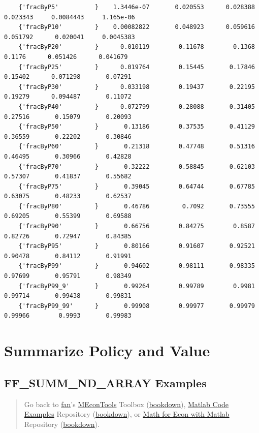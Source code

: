 \documentclass[
]{book}
\begin{document}
\begin{verbatim}
    {'fracByP5'          }    1.3446e-07       0.020553      0.028388      0.023343     0.0084443     1.165e-06 
    {'fracByP10'         }    0.00082822       0.048923      0.059616      0.051792      0.020041     0.0045383 
    {'fracByP20'         }      0.010119        0.11678        0.1368        0.1176      0.051426      0.041679 
    {'fracByP25'         }      0.019764        0.15445       0.17846       0.15402      0.071298       0.07291 
    {'fracByP30'         }      0.033198        0.19437       0.22195       0.19279      0.094487       0.11072 
    {'fracByP40'         }      0.072799        0.28088       0.31405       0.27516       0.15079       0.20093 
    {'fracByP50'         }       0.13186        0.37535       0.41129       0.36559       0.22202       0.30846 
    {'fracByP60'         }       0.21318        0.47748       0.51316       0.46495       0.30966       0.42828 
    {'fracByP70'         }       0.32222        0.58845       0.62103       0.57307       0.41837       0.55682 
    {'fracByP75'         }       0.39045        0.64744       0.67785       0.63075       0.48233       0.62537 
    {'fracByP80'         }       0.46786         0.7092       0.73555       0.69205       0.55399       0.69588 
    {'fracByP90'         }       0.66756        0.84275        0.8587       0.82726       0.72947       0.84385 
    {'fracByP95'         }       0.80166        0.91607       0.92521       0.90478       0.84112       0.91991 
    {'fracByP99'         }       0.94602        0.98111       0.98335       0.97699       0.95791       0.98349 
    {'fracByP99_9'       }       0.99264        0.99789        0.9981       0.99714       0.99438       0.99831 
    {'fracByP99_99'      }       0.99908        0.99977       0.99979       0.99966        0.9993       0.99983
\end{verbatim}

\hypertarget{summarize-policy-and-value}{%
\chapter{Summarize Policy and Value}\label{summarize-policy-and-value}}

\hypertarget{ff_summ_nd_array-examples}{%
\section{FF\_SUMM\_ND\_ARRAY Examples}\label{ff_summ_nd_array-examples}}

\begin{quote}
Go back to \href{http://fanwangecon.github.io/}{fan}'s \href{https://fanwangecon.github.io/MEconTools/}{MEconTools} Toolbox (\href{https://fanwangecon.github.io/MEconTools/bookdown}{bookdown}), \href{https://fanwangecon.github.io/M4Econ/}{Matlab Code Examples} Repository (\href{https://fanwangecon.github.io/M4Econ/bookdown}{bookdown}), or \href{https://fanwangecon.github.io/Math4Econ/}{Math for Econ with Matlab} Repository (\href{https://fanwangecon.github.io/Math4Econ/bookdown}{bookdown}).
\end{quote}
\end{document}
